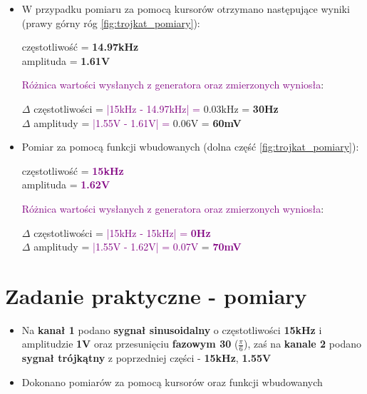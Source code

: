 \begin{itemize}
    \item W przypadku pomiaru za pomocą kursorów otrzymano następujące wyniki (prawy górny róg \ref{fig:trojkat_pomiary}):
    \begin{center}
        częstotliwość = \textbf{14.97kHz} \\
        amplituda = \textbf{1.61V}
    \end{center}
    \label{ad:roznica_2_3-2}
    \textcolor{purple}{Różnica wartości wysłanych z generatora oraz zmierzonych wyniosła}:
    \begin{center}
        $\Delta$ częstotliwości = \textcolor{purple}{|15kHz - 14.97kHz| =} 0.03kHz = \textbf{30Hz} \\
        $\Delta$ amplitudy = \textcolor{purple}{|1.55V - 1.61V| =} 0.06V = \textbf{60mV}
    \end{center}
    
    \item Pomiar za pomocą funkcji wbudowanych (dolna część \eqref{fig:trojkat_pomiary}):
    \begin{center}
        częstotliwość = \textcolor{purple}{\textbf{15kHz}} \\
        amplituda = \textcolor{purple}{\textbf{1.62V}}
    \end{center}
    \textcolor{purple}{Różnica wartości wysłanych z generatora oraz zmierzonych wyniosła}:
    \label{ad:roznica_2_3-3}
    \begin{center}
        \label{ad:odczyt_2_3}
        $\Delta$ częstotliwości = \textcolor{purple}{|15kHz - 15kHz| = \textbf{0Hz}} \\
        $\Delta$ amplitudy = \textcolor{purple}{|1.55V - 1.62V| = 0.07V} = \textcolor{purple}{\textbf{70mV}}
    \end{center}
\end{itemize}

\section {Zadanie praktyczne - pomiary}

\begin{itemize}
    \item Na \textbf{kanał 1} podano \textbf{sygnał sinusoidalny} o częstotliwości \textbf{15kHz} i amplitudzie \textbf{1V} oraz przesunięciu \textbf{fazowym 30\boldsymbol{\degree}} ($\frac{\pi}{6}$), zaś na\textbf{ kanale 2} podano \textbf{sygnał trójkątny} z poprzedniej części - \textbf{15kHz}, \textbf{1.55V}
    \item Dokonano pomiarów za pomocą kursorów oraz funkcji wbudowanych
\end{itemize}


